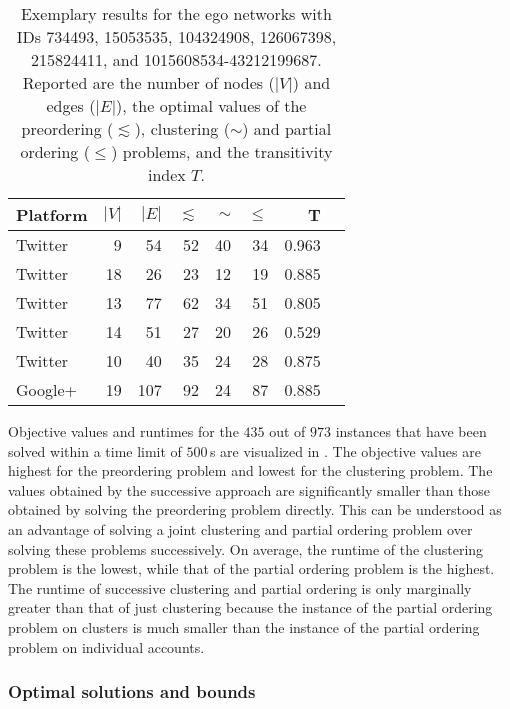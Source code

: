 \begin{table}[b]
    \caption{Exemplary results for the ego networks with IDs 734493, 15053535, 104324908, 126067398, 215824411, and 1015608534-43212199687.
    Reported are the number of nodes ($|V|$) and edges ($|E|$), the optimal values of the preordering ($\lesssim$), clustering ($\sim$) and partial ordering ($\leq$) problems, and the transitivity index $T$.}
    \label{tab:clustering-vs-ordering}
    \begin{center}
	\small   
    \begin{tabular}{lrrrrrrr}
    \toprule
    Platform & $|V|$ & $|E|$ & $\lesssim$ & $\sim$ & $\leq$ & T \\
    \midrule
    Twitter &  9 &  54 & 52 & 40 & 34 & 0.963 \\
    Twitter & 18 &  26 & 23 & 12 & 19 & 0.885 \\
    Twitter & 13 &  77 & 62 & 34 & 51 & 0.805 \\
    Twitter & 14 &  51 & 27 & 20 & 26 & 0.529 \\
    Twitter & 10 &  40 & 35 & 24 & 28 & 0.875 \\
    Google+ & 19 & 107 & 92 & 24 & 87 & 0.885 \\
    \bottomrule
    \end{tabular}
    \end{center}
    \vspace{-0.1in}
\end{table}

Objective values and runtimes for the $435$ out of $973$ instances that have been solved within a time limit of $500\,$s are visualized in .
%
The objective values are highest for the preordering problem and lowest for the clustering problem.
The values obtained by the successive approach are significantly smaller than those obtained by solving the preordering problem directly.
This can be understood as an advantage of solving a joint clustering and partial ordering problem over solving these problems successively.
%
On average, the runtime of the clustering problem is the lowest, while that of the partial ordering problem is the highest.
The runtime of successive clustering and partial ordering is only marginally greater than that of just clustering because the instance of the partial ordering problem on clusters is much smaller than the instance of the partial ordering problem on individual accounts.



\subsubsection{Optimal solutions and bounds}

